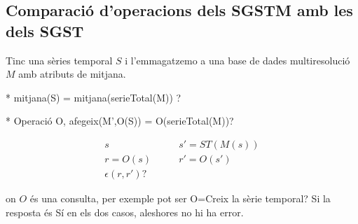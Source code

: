 






\subsection{Comparació d'operacions dels SGSTM amb les dels SGST}

Tinc una sèries temporal $S$ i l'emmagatzemo a una base de dades multiresolució $M$ amb atributs de mitjana. 

* mitjana(S) = mitjana(serieTotal(M)) ?

* Operació O, afegeix(M',O(S)) = O(serieTotal(M))?


\begin{align*}
s   \qquad   &  s'=ST(M(s))\\
r=O(s) \qquad& r'=O(s') \\
\epsilon(r,r')?
\end{align*}

on $O$ és una consulta, per exemple pot ser O=Creix la sèrie temporal? Si la resposta és Sí en els dos casos, aleshores no hi ha error.

















